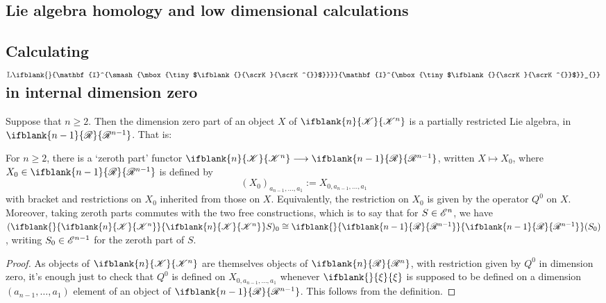 \documentclass[10pt]{article}
\newcommand{\GS}[1]{\scrE^{#1}}
\newcommand{\PRLie}[1]%
{\ifblank{#1}{\scrR}{\scrR^{#1}}}
\newcommand{\LL}[1]{\ifblank{#1}{\scrK}{\scrK^{#1}}}
\newcommand{\Ind}[2][]{\ifblank{#1}{\mathbf{I}^{\smash{\mbox{\tiny $#2$}}}}{\mathbf{I}^{\mbox{\tiny $#2$}}_{#1}}}%
\newcommand{\Fr}[2][]{\ifblank{#1}{#2}{#2_{#1}}}
\newcommand{\restn}[2][]{\ifblank{#1}{\xi{#2}}{\xi_{#1}{#2}}}%
\newcommand{\derived}{\mathbb{L}}
\renewcommand{\Q}{Q}
\begin{document}
\begin{DerivedFunctorsLowDimension}
\pagebreak
\section{Lie algebra homology and low dimensional calculations}
\subsection{Calculating $\derived\Ind{\LL{}}$ in internal dimension zero}
Suppose that $n\geq2$. Then the dimension zero part of an object $X$ of $\LL{n}$ is a partially restricted Lie algebra, in $\PRLie{n-1}$. That is: 
\begin{lem}
For $n\geq2$, there is a `zeroth part' functor $\LL{n}\to\PRLie{n-1}$, written $X\mapsto X_0$, where $X_0\in\PRLie{n-1}$ is defined by
\[(X_0)_{a_{n-1},\ldots,a_1}:=X_{0,a_{n-1},\ldots,a_1}\]
with bracket and restrictions on $X_0$ inherited from those on $X$. Equivalently, the restriction on $X_0$ is given by the operator $\Q^0$ on $X$. Moreover, taking zeroth parts commutes with the two free constructions, which is to say that for $S\in\GS{n}$, we have $(\Fr{\LL{n}}S)_0\cong\Fr{\PRLie{n-1}}(S_0)$, writing $S_0\in\GS{n-1}$ for the zeroth part of $S$.
\end{lem}
\begin{proof}
As objects of $\LL{n}$ are themselves objects of $\PRLie{n}$, with restriction given by $\Q^0$ in dimension zero, it's enough just to check that $\Q^0$ is defined on $X_{0,a_{n-1},\ldots,a_1}$ whenever $\restn{}$ is supposed to be defined on a dimension $(a_{n-1},\ldots,a_1)$ element of an object of $\PRLie{n-1}$. This follows from the definition.


\end{proof}
\end{DerivedFunctorsLowDimension}
\end{document}
